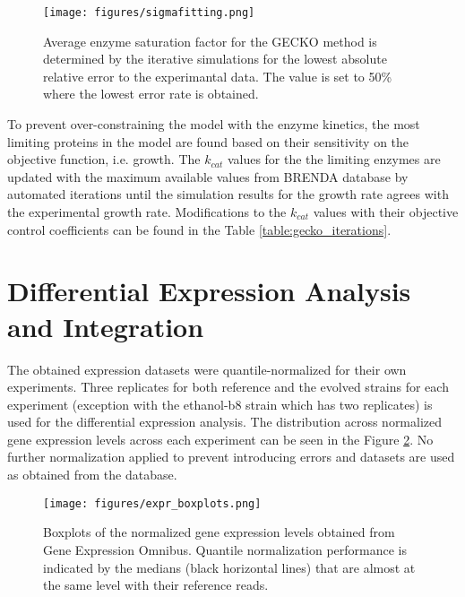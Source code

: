 \begin{figure}[H]
  \begin{center}
  \texttt{[image: figures/sigmafitting.png]}
  \caption[Average enzyme saturation factor for the GECKO method is determined by the iterative simulations for the lowest absolute relative error to the experimantal data]{Average enzyme saturation factor for the GECKO method is determined by the iterative simulations for the lowest absolute relative error to the experimantal data. The value is set to 50\% where the lowest error rate is obtained.}
  \end{center}
  \label{fig:sigma_fitting}
\end{figure}

To prevent over-constraining the model with the enzyme kinetics, the most limiting proteins in the model are found based on their sensitivity on the objective function, i.e. growth. The $k_{cat}$ values for the the limiting enzymes are updated with the maximum available values from BRENDA\cite{jeske2019brenda} database by automated iterations until the simulation results for the growth rate agrees with the experimental growth rate. Modifications to the $k_{cat}$ values with their objective control coefficients can be found in the Table \ref{table:gecko_iterations}.



\vspace{-0.5cm}
\section{Differential Expression Analysis and Integration}

The obtained expression datasets were quantile-normalized for their own experiments. Three replicates for both reference and the evolved strains for each experiment (exception with the ethanol-b8 strain which has two replicates) is used for the differential expression analysis. The distribution across normalized gene expression levels across each experiment can be seen in the Figure \ref{fig:expr_boxplot}. No further normalization applied to prevent introducing errors and datasets are used as obtained from the database.

\begin{figure}[H]
\begin{center}
\texttt{[image: figures/expr\_boxplots.png]}
\caption[Boxplots of the normalized gene expression levels]{Boxplots of the normalized gene expression levels obtained from Gene Expression Omnibus. Quantile normalization performance is indicated by the medians (black horizontal lines) that are almost at the same level with their reference reads.}
\end{center}
\label{fig:expr_boxplot}
\end{figure}

